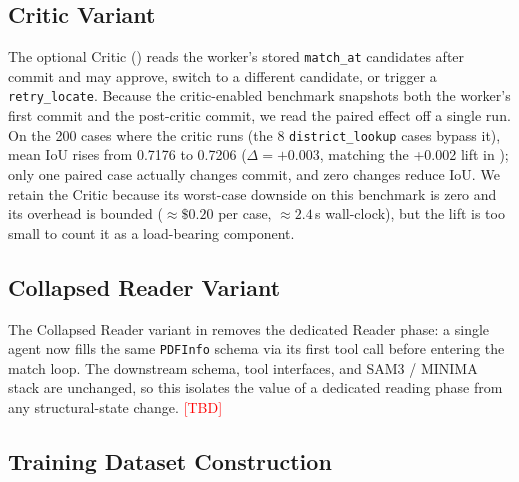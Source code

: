 \documentclass[11pt]{article}
\newcommand{\placeholder}{\textcolor{red}{\textsf{[TBD]}}}
\begin{document}
\subsection{Critic Variant}
\label{appendix:critic-variant}

The optional Critic () reads the worker's stored \texttt{match\_at} candidates after commit and may approve, switch to a different candidate, or trigger a \texttt{retry\_locate}. Because the critic-enabled benchmark snapshots both the worker's first commit and the post-critic commit, we read the paired effect off a single run. On the 200 cases where the critic runs (the 8 \texttt{district\_lookup} cases bypass it), mean IoU rises from 0.7176 to 0.7206 ($\Delta = +0.003$, matching the +0.002 lift in ); only one paired case actually changes commit, and zero changes reduce IoU. We retain the Critic because its worst-case downside on this benchmark is zero and its overhead is bounded ($\approx \$0.20$ per case, $\approx 2.4$\,s wall-clock), but the lift is too small to count it as a load-bearing component.

\subsection{Collapsed Reader Variant}
\label{appendix:reader-variant}

The Collapsed Reader variant in  removes the dedicated Reader phase: a single agent now fills the same \texttt{PDFInfo} schema via its first tool call before entering the match loop. The downstream schema, tool interfaces, and SAM3 / MINIMA stack are unchanged, so this isolates the value of a dedicated reading phase from any structural-state change. \placeholder

\subsection{Training Dataset Construction}
\label{appendix:dataset-prep}
\end{document}
